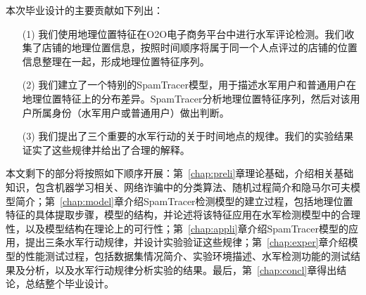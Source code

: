 本次毕业设计的主要贡献如下列出：

\begin{enumerate}
	\item[(1)] 我们使用地理位置特征在O2O电子商务平台中进行水军评论检测。我们收集了店铺的地理位置信息，按照时间顺序将属于同一个人点评过的店铺的位置信息整理在一起，形成地理位置特征序列。
	\item[(2)]  我们建立了一个特别的SpamTracer模型，用于描述水军用户和普通用户在地理位置特征上的分布差异。SpamTracer分析地理位置特征序列，然后对该用户所属身份（水军用户或普通用户）做出判断。
	\item[(3)]  我们提出了三个重要的水军行动的关于时间地点的规律。我们的实验结果证实了这些规律并给出了合理的解释。
\end{enumerate}

本文剩下的部分将按照如下顺序开展：第~\ref{chap:preli}章理论基础，介绍相关基础知识，包含机器学习相关、网络诈骗中的分类算法、随机过程简介和隐马尔可夫模型简介；第~\ref{chap:model}章介绍SpamTracer检测模型的建立过程，包括地理位置特征的具体提取步骤，模型的结构，并论述将该特征应用在水军检测模型中的合理性，以及模型结构在理论上的可行性；第~\ref{chap:appli}章介绍SpamTracer模型的应用，提出三条水军行动规律，并设计实验验证这些规律；第~\ref{chap:exper}章介绍模型的性能测试过程，包括数据集情况简介、实验环境描述、水军检测功能的测试结果及分析，以及水军行动规律分析实验的结果。最后，第~\ref{chap:concl}章得出结论，总结整个毕业设计。




